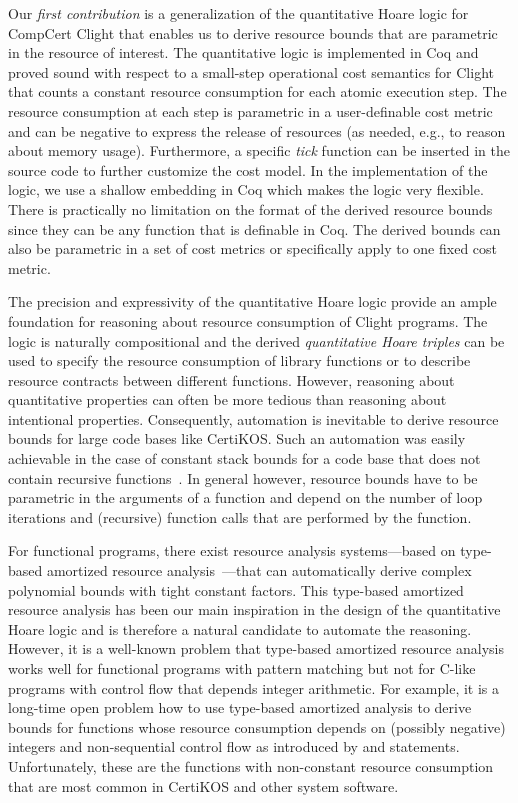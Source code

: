 \documentclass[nocopyrightspace,preprint]{sigplanconf}
\begin{document}
Our \emph{first contribution} is a generalization of the quantitative
Hoare logic for CompCert Clight that enables us to derive resource
bounds that are parametric in the resource of interest.  The
quantitative logic is implemented in Coq and proved sound with respect
to a small-step operational cost semantics for Clight that counts a
constant resource consumption for each atomic execution step.  The
resource consumption at each step is parametric in a user-definable cost
metric and can be negative to express the release of resources (as
needed, e.g., to reason about memory usage).  Furthermore, a specific
\emph{tick} function can be inserted in the source code to further
customize the cost model.  In the implementation of the logic, we use
a shallow embedding in Coq which makes the logic very flexible.  There
is practically no limitation on the format of the derived resource
bounds since they can be any function that is definable in Coq.  The
derived bounds can also be parametric in a set of cost metrics or
specifically apply to one fixed cost metric.

The precision and expressivity of the quantitative Hoare logic provide
an ample foundation for reasoning about resource consumption of Clight
programs.  The logic is naturally compositional and the derived
\emph{quantitative Hoare triples} can be used to specify the resource
consumption of library functions or to describe resource contracts
between different functions.  However, reasoning about quantitative
properties can often be more tedious than reasoning about intentional
properties.  Consequently, automation is inevitable to derive resource
bounds for large code bases like CertiKOS.  Such an automation was
easily achievable in the case of constant stack bounds for a code base
that does not contain recursive functions~\cite{veristack14}.  In
general however, resource bounds have to be parametric in the
arguments of a function and depend on the number of loop iterations
and (recursive) function calls that are performed by the function.

For functional programs, there exist resource analysis systems---based
on type-based amortized resource analysis~\cite{Jost03,
  HoffmannAH12}---that can automatically derive complex polynomial
bounds with tight constant factors.  This type-based amortized
resource analysis has been our main inspiration in the design of the
quantitative Hoare logic and is therefore a natural candidate to
automate the reasoning.  However, it is a well-known problem that
type-based amortized resource analysis works well for functional
programs with pattern matching but not for C-like programs with
control flow that depends integer arithmetic.  For example, it is a
long-time open problem how to use type-based amortized analysis to
derive bounds for functions whose resource consumption depends on
(possibly negative) integers and non-sequential control flow as
introduced by  and  statements.
Unfortunately, these are the functions with non-constant resource
consumption that are most common in CertiKOS and other system
software.
\end{document}
